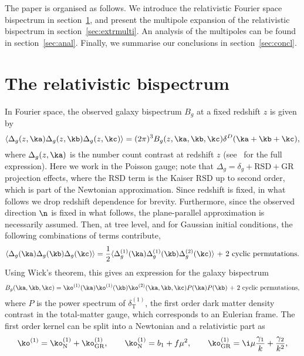 The paper is organised as follows. We introduce the relativistic Fourier space bispectrum in section~\ref{sec:relbisp}, and present the multipole expansion of the relativistic bispectrum in section~\ref{sec:extrmulti}. An analysis of the multipoles can be found in section~\ref{sec:anal}. Finally, we summarise our conclusions in section~\ref{sec:concl}.


\section{The relativistic bispectrum}\label{sec:relbisp}

In Fourier space, the observed galaxy bispectrum \(B_g\) at a fixed redshift \(z\) is given by~\cite{Jolicoeur:2017nyt,Jolicoeur:2017eyi}
\begin{equation}
	\langle \Delta_g(z,\ka) \Delta_g(z,\kb) \Delta_g(z,\kc) \rangle = (2\pi)^3 B_g(z,\ka,\kb,\kc) \delta^D(\ka+\kb+\kc),
\end{equation}
where \(\Delta_g(z, \ka)\) is the number count contrast at redshift \(z\) (see~\cite{Jolicoeur:2017nyt} for the full expression). Here we work in the Poisson gauge; note that \(\Delta_g = \delta_g + \text{RSD}+\text{GR}\) projection effects, where the RSD term is the Kaiser RSD up to second order, which is part of the Newtonian approximation. Since redshift is fixed, in what follows we drop redshift dependence for brevity. Furthermore, since the observed direction \(\n\) is fixed in what follows, the plane-parallel approximation is necessarily assumed. Then, at tree level, and for Gaussian initial conditions, the following combinations of terms contribute, 
\begin{equation}
\langle \Delta_g(\ka)\Delta_g(\kb)\Delta_g(\kc) \rangle = \frac{1}{2} \langle \Delta_g^{(1)}(\ka)\Delta_g^{(1)}(\kb)\Delta_g^{(2)}(\kc)\rangle \text{ + 2 cyclic permutations.}
\end{equation}
Using Wick's theorem, this gives an expression for the galaxy bispectrum ~\cite{Jolicoeur:2017nyt}
\begin{equation}
B_g(\ka, \kb,\kc)= \ko^{(1)}(\ka) \ko^{(1)}(\kb) \ko^{(2)}(\ka,\kb,\kc)P(\ka) P(\kb)\text{ + 2 cyclic permutations},
\end{equation}
where \(P\) is the power spectrum of \(\delta_\mathrm{T}^{(1)}\), the first order dark matter density contrast in the total-matter gauge, which corresponds to an Eulerian frame. The first order kernel can be split into a Newtonian and a relativistic part as~\cite{Jeong_2012}
\begin{equation}
\ko^{(1)} = \ko^{(1)}_\mathrm{N} + \ko^{(1)}_\mathrm{GR}, \qquad \ko^{(1)}_\mathrm{N}= b_1 + f \mu^2, \qquad \ko^{(1)}_\mathrm{GR} = \i \mu \frac{\gamma_1}{k} + \frac{\gamma_2}{k^2}, 
\end{equation}
